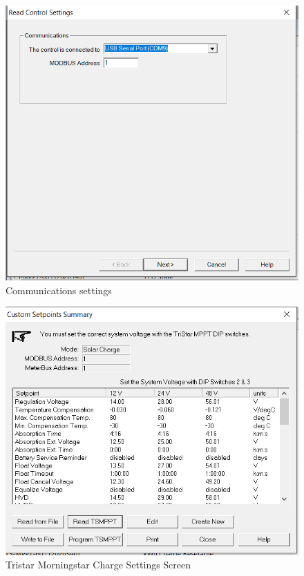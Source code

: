 \begin{figure}[!htb]
	\centering
	\includegraphics[width=\columnwidth]{./graphics/tsmppt_troubleshooting/ms_4.png}
	\caption{\label{fig:my-label} Communications settings}
\end{figure}

\begin{figure}[!htb]
	\centering
	\includegraphics[width=\columnwidth]{./graphics/tsmppt_troubleshooting/ms_5.png}
	\caption{\label{fig:my-label} Tristar Morningstar Charge Settings Screen}
\end{figure}

